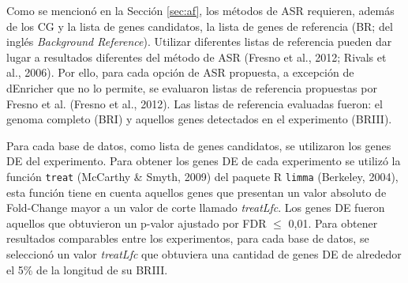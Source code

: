 \documentclass[12pt,twoside]{reedthesis}
\begin{document}
\par

Como se mencionó en la Sección \ref{sec:af}, los métodos de ASR requieren, además de los CG y la lista de genes candidatos, la lista de genes de referencia (BR; del inglés \emph{Background Reference}). Utilizar diferentes listas de referencia pueden dar lugar a resultados diferentes del método de ASR (Fresno et al., 2012; Rivals et al., 2006). Por ello, para cada opción de ASR propuesta, a excepción de dEnricher que no lo permite, se evaluaron listas de referencia propuestas por Fresno et al. (Fresno et al., 2012). Las listas de referencia evaluadas fueron: el genoma completo (BRI) y aquellos genes detectados en el experimento (BRIII).

\par

Para cada base de datos, como lista de genes candidatos, se utilizaron los genes DE del experimento. Para obtener los genes DE de cada experimento se utilizó la función \texttt{treat} (McCarthy \& Smyth, 2009) del paquete R \texttt{limma} (Berkeley, 2004), esta función tiene en cuenta aquellos genes que presentan un valor absoluto de Fold-Change mayor a un valor de corte llamado \emph{treatLfc}. Los genes DE fueron aquellos que obtuvieron un p-valor ajustado por FDR \(\leq\) 0,01. Para obtener resultados comparables entre los experimentos, para cada base de datos, se seleccionó un valor \emph{treatLfc} que obtuviera una cantidad de genes DE de alrededor el 5\% de la longitud de su BRIII.

\par
\end{document}
